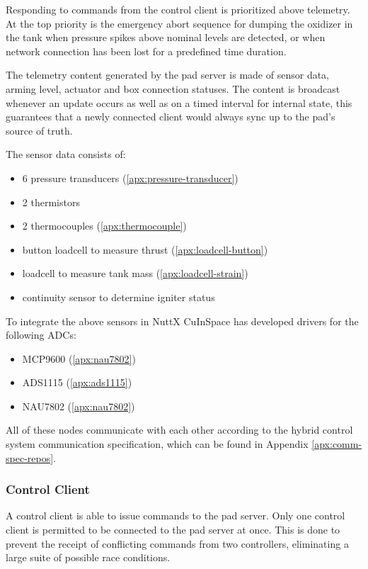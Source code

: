 Responding to commands from the control client is prioritized above telemetry. At the top priority is the emergency
abort sequence for dumping the oxidizer in the tank when pressure spikes above nominal levels are detected, or when
network connection has been lost for a predefined time duration.

The telemetry content generated by the pad server is made of sensor data, arming level, actuator and box connection statuses.
The content is broadcast whenever an update occurs as well as on a timed interval for internal state, this guarantees that a newly connected
client would always sync up to the pad's source of truth. 

The sensor data consists of:
\begin{itemize}
    \item{6 pressure transducers (\ref{apx:pressure-transducer})}
    \item{2 thermistors}
    \item{2 thermocouples (\ref{apx:thermocouple})}
    \item{button loadcell to measure thrust (\ref{apx:loadcell-button})}
    \item{loadcell to measure tank mass (\ref{apx:loadcell-strain})}
    \item{continuity sensor to determine igniter status}
\end{itemize}

To integrate the above sensors in NuttX CuInSpace has developed drivers for the following ADCs:
\begin{itemize}
    \item{MCP9600 (\ref{apx:nau7802})}
    \item{ADS1115 (\ref{apx:ads1115})}
    \item{NAU7802 (\ref{apx:nau7802})}
\end{itemize}

All of these nodes communicate with each other according to the hybrid control system communication specification,
which can be found in Appendix \ref{apx:comm-spec-repos}.

\subsubsection{Control Client}

A control client is able to issue commands to the pad server. Only one control client is permitted to be connected to
the pad server at once. This is done to prevent the receipt of conflicting commands from two controllers, eliminating a
large suite of possible race conditions.

